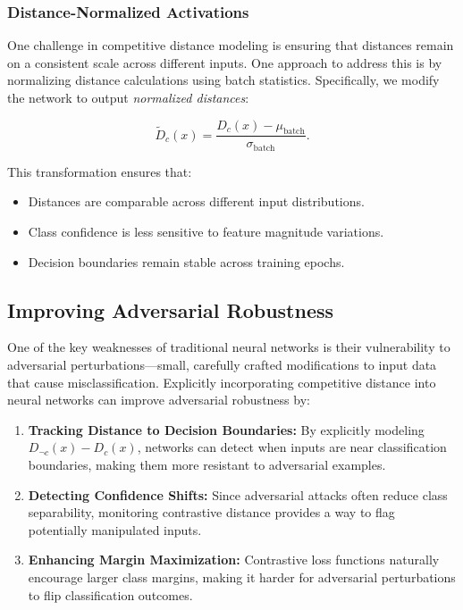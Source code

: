 \subsubsection{Distance-Normalized Activations}

One challenge in competitive distance modeling is ensuring that distances remain on a consistent scale across different inputs. One approach to address this is by normalizing distance calculations using batch statistics. Specifically, we modify the network to output \textit{normalized distances}:

\[
\tilde{D}_c(x) = \frac{D_c(x) - \mu_{\text{batch}}}{\sigma_{\text{batch}}}.
\]

This transformation ensures that:

\begin{itemize}
    \item Distances are comparable across different input distributions.
    \item Class confidence is less sensitive to feature magnitude variations.
    \item Decision boundaries remain stable across training epochs.
\end{itemize}

\subsection{Improving Adversarial Robustness}

One of the key weaknesses of traditional neural networks is their vulnerability to adversarial perturbations—small, carefully crafted modifications to input data that cause misclassification. Explicitly incorporating competitive distance into neural networks can improve adversarial robustness by:

\begin{enumerate}
    \item \textbf{Tracking Distance to Decision Boundaries:} By explicitly modeling \( D_{\neg c}(x) - D_c(x) \), networks can detect when inputs are near classification boundaries, making them more resistant to adversarial examples.
    \item \textbf{Detecting Confidence Shifts:} Since adversarial attacks often reduce class separability, monitoring contrastive distance provides a way to flag potentially manipulated inputs.
    \item \textbf{Enhancing Margin Maximization:} Contrastive loss functions naturally encourage larger class margins, making it harder for adversarial perturbations to flip classification outcomes.
\end{enumerate}

